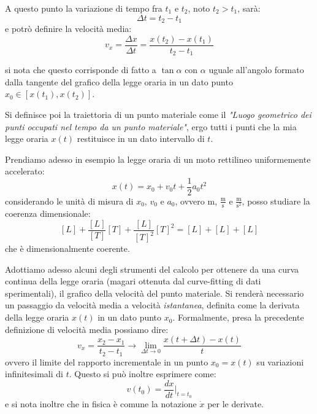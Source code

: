 \documentclass[a4paper,12pt]{article}
\begin{document}
A questo punto la variazione di tempo fra $t_1$ e $t_2$, noto $t_2 > t_1$, sarà:
$$ \Delta t = t_2 - t_1 $$
e potrò definire la velocità media:
$$ v_x = \frac{\Delta x}{\Delta t} = \frac{x(t_2)- x(t_1)}{t_2- t_1} $$

si nota che questo corrisponde di fatto a $\tan{\alpha}$ con $\alpha$ uguale all'angolo formato dalla tangente
del grafico della legge oraria in un dato punto $x_0 \in [x(t_1), x(t_2)]$.

Si definisce poi la traiettoria di un punto materiale come il \textit{"Luogo geometrico dei punti occupati nel tempo da
un punto materiale"}, ergo tutti i punti che la mia legge oraria $x(t)$ restituisce in un dato intervallo di $t$.
\par\smallskip
Prendiamo adesso in esempio la legge oraria di un moto rettilineo uniformemente accelerato:
$$ x(t) = x_0+v_0t + \frac{1}{2}a_0t^2 $$
considerando le unità di misura di $x_0$, $v_0$ e $a_0$, ovvero m, $\frac{\mathrm{m}}{\mathrm{s}}$ e $\frac{\mathrm{m}}{\mathrm{s}^2}$,
posso studiare la coerenza dimensionale:
$$ [L] + \frac{[L]}{[T]} [T] + \frac{[L]}{[T]^2}[T]^2 = [L]+ [L]+ [L] $$
che è dimensionalmente coerente.
\par\smallskip
Adottiamo adesso alcuni degli strumenti del calcolo per ottenere da una curva continua della legge oraria
(magari ottenuta dal curve-fitting di dati sperimentali), il grafico della velocità del punto materiale.
Si renderà necessario un passaggio da velocità media a velocità \textit{istantanea}, definita come la derivata
della legge oraria $x(t)$ in un dato punto $x_0$. Formalmente, presa la precedente definizione di velocità media
possiamo dire:
$$ v_x = \frac{x_2-x_1}{t_2-t_1} \rightarrow \lim_{\Delta t \rightarrow 0} \frac{x(t + \Delta t) - x(t)}{t} $$
ovvero il limite del rapporto incrementale in un punto $x_0 = x(t)$ su variazioni infinitesimali di $t$.
Questo si può inoltre esprimere come:
$$ v(t_0) = \frac{dx}{dt} \bigg |_{t=t_0} $$
e si nota inoltre che in fisica è comune la notazione $\dot{x}$ per le derivate.
\end{document}
